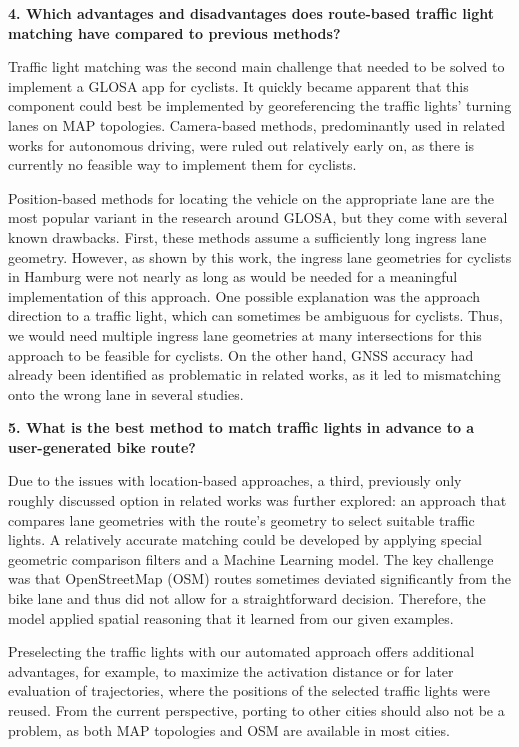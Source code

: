 \textbf{\color{cidarkblue}4. Which advantages and disadvantages does route-based traffic light matching have compared to previous methods?} 

Traffic light matching was the second main challenge that needed to be solved to implement a GLOSA app for cyclists. It quickly became apparent that this component could best be implemented by georeferencing the traffic lights' turning lanes on MAP topologies. Camera-based methods, predominantly used in related works for autonomous driving, were ruled out relatively early on, as there is currently no feasible way to implement them for cyclists. 

Position-based methods for locating the vehicle on the appropriate lane are the most popular variant in the research around GLOSA, but they come with several known drawbacks. First, these methods assume a sufficiently long ingress lane geometry. However, as shown by this work, the ingress lane geometries for cyclists in Hamburg were not nearly as long as would be needed for a meaningful implementation of this approach. One possible explanation was the approach direction to a traffic light, which can sometimes be ambiguous for cyclists. Thus, we would need multiple ingress lane geometries at many intersections for this approach to be feasible for cyclists. On the other hand, GNSS accuracy had already been identified as problematic in related works, as it led to mismatching onto the wrong lane in several studies.

\textbf{\color{cidarkblue}5. What is the best method to match traffic lights in advance to a user-generated bike route?}

Due to the issues with location-based approaches, a third, previously only roughly discussed option in related works was further explored: an approach that compares lane geometries with the route's geometry to select suitable traffic lights. A relatively accurate matching could be developed by applying special geometric comparison filters and a Machine Learning model. The key challenge was that OpenStreetMap (OSM) routes sometimes deviated significantly from the bike lane and thus did not allow for a straightforward decision. Therefore, the model applied spatial reasoning that it learned from our given examples.

Preselecting the traffic lights with our automated approach offers additional advantages, for example, to maximize the activation distance or for later evaluation of trajectories, where the positions of the selected traffic lights were reused. From the current perspective, porting to other cities should also not be a problem, as both MAP topologies and OSM are available in most cities. 

